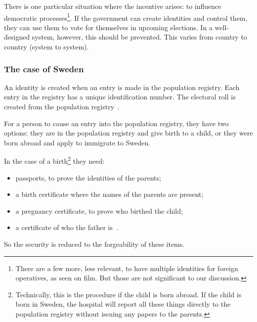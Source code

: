 There is one particular situation where the incentive arises:
to influence democratic processes\footnote{%
  There are a few more, less relevant, \eg to have multiple identities for 
  foreign operatives, as seen on film.
  But those are not significant to our discussion.
}.
If the government can create identities and control them, they can use them to 
vote for themselves in upcoming elections.
In a well-designed system, however, this should be prevented.
This varies from country to country (\ie system to system).

\subsubsection{The case of Sweden}

An identity is created when an entry is made in the population registry.
Each entry in the registry has a unique identification number.
The electoral roll is created from the population 
registry~\cite{Valmyndigheten-ElectoralRoll}.

For a person to cause an entry into the population registry, they have two 
options:
they are in the population registry and give birth to a child, or
they were born abroad and apply to immigrate to Sweden.

In the case of a birth\footnote{%
  Technically, this is the procedure if the child is born abroad.
  If the child is born in Sweden, the hospital will report all these things 
  directly to the population registry without issuing any papers to the 
  parents.
} they need:
\begin{itemize}
  \item passports, to prove the identities of the parents;
  \item a birth certificate where the names of the parents are present;
  \item a pregnancy certificate, to prove who birthed the child;
  \item a certificate of who the father is~\cite{Skatteverket-RegisterBirth}.
\end{itemize}
So the security is reduced to the forgeability of these items.

